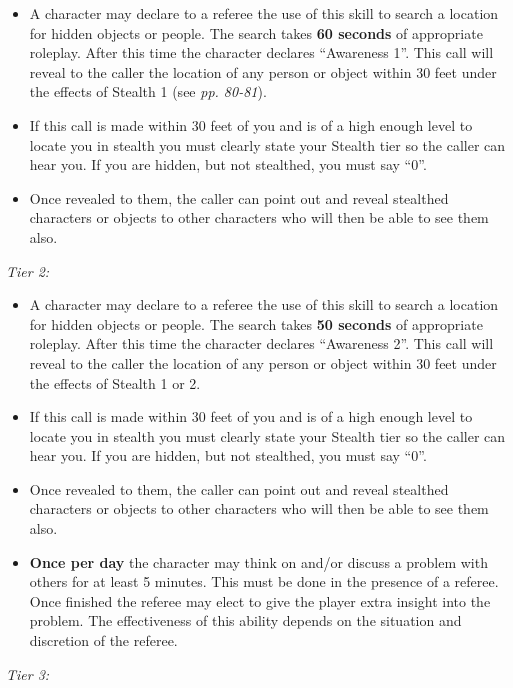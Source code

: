 \documentclass{scrbook}
\begin{document}
\begin{itemize}
\item A character may declare to a referee the use of this skill to search a location for hidden objects or people. The search takes \textbf{60 seconds} of appropriate roleplay. After this time the character declares ``Awareness 1''. This call will reveal to the caller the location of any person or object within 30 feet under the effects of Stealth 1 (see \textit{pp. 80-81}).

\item If this call is made within 30 feet of you and is of a high enough level to locate you in stealth you must clearly state your Stealth tier so the caller can hear you. If you are hidden, but not stealthed, you must say ``0''.

\item Once revealed to them, the caller can point out and reveal stealthed characters or objects to other characters who will then be able to see them also.

\end{itemize}
\textit{Tier 2:}

\begin{itemize}
\item A character may declare to a referee the use of this skill to search a location for hidden objects or people. The search takes \textbf{50 seconds} of appropriate roleplay. After this time the character declares ``Awareness 2''. This call will reveal to the caller the location of any person or object within 30 feet under the effects of Stealth 1 or 2.

\item If this call is made within 30 feet of you and is of a high enough level to locate you in stealth you must clearly state your Stealth tier so the caller can hear you. If you are hidden, but not stealthed, you must say ``0''.

\item Once revealed to them, the caller can point out and reveal stealthed characters or objects to other characters who will then be able to see them also.

\item \textbf{Once per day} the character may think on and/or discuss a problem with others for at least 5 minutes. This must be done in the presence of a referee. Once finished the referee may elect to give the player extra insight into the problem. The effectiveness of this ability depends on the situation and discretion of the referee.

\end{itemize}
\textit{Tier 3:}
\end{document}
